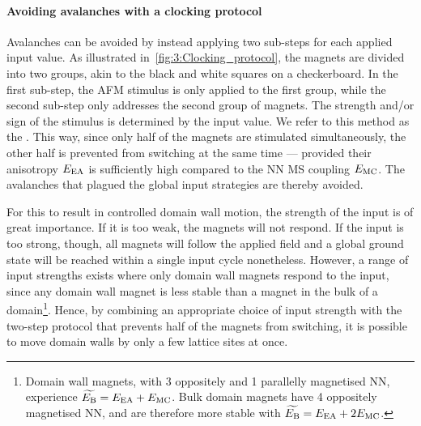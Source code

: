 \paragraph{Avoiding avalanches with a clocking protocol}
Avalanches can be avoided by instead applying two sub-steps for each applied input value. As illustrated in~\cref{fig:3:Clocking_protocol}, the magnets are divided into two groups, akin to the black and white squares on a checkerboard.
In the first sub-step, the AFM stimulus is only applied to the first group, while the second sub-step only addresses the second group of magnets.
The strength and/or sign of the stimulus is determined by the input value.
We refer to this method as the .
This way, since only half of the magnets are stimulated simultaneously, the other half is prevented from switching at the same time --- provided their anisotropy $E_\mathrm{EA}$ is sufficiently high compared to the NN MS coupling $E_\mathrm{MC}$.
The avalanches that plagued the global input strategies are thereby avoided. \par
For this to result in controlled domain wall motion, the strength of the input is of great importance.
If it is too weak, the magnets will not respond.
If the input is too strong, though, all magnets will follow the applied field and a global ground state will be reached within a single input cycle nonetheless.
However, a range of input strengths exists where only domain wall magnets respond to the input, since any domain wall magnet is less stable than a magnet in the bulk of a domain\footnote{
	Domain wall magnets, with 3 oppositely and 1 parallelly magnetised NN, experience $\widetilde{E_\mathrm{B}} = E_\mathrm{EA} + E_\mathrm{MC}$. Bulk domain magnets have 4 oppositely magnetised NN, and are therefore more stable with $\widetilde{E_\mathrm{B}} = E_\mathrm{EA} + 2E_\mathrm{MC}$.
}.
Hence, by combining an appropriate choice of input strength with the two-step protocol that prevents half of the magnets from switching, it is possible to move domain walls by only a few lattice sites at once. %


